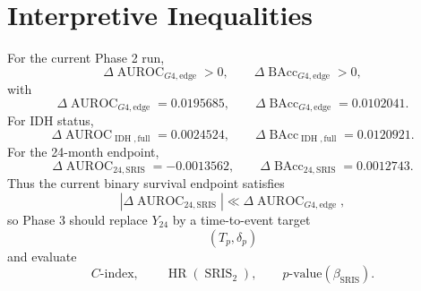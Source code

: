 \documentclass[11pt]{article}
\newcommand{\SRIS}{\operatorname{SRIS}}
\newcommand{\AUC}{\operatorname{AUROC}}
\newcommand{\BAcc}{\operatorname{BAcc}}
\begin{document}
\section{Interpretive Inequalities}

For the current Phase 2 run,
\[
\Delta\AUC_{G4,\text{edge}}>0,
\qquad
\Delta\BAcc_{G4,\text{edge}}>0,
\]
with
\[
\Delta\AUC_{G4,\text{edge}}=0.0195685,
\qquad
\Delta\BAcc_{G4,\text{edge}}=0.0102041.
\]
For IDH status,
\[
\Delta\AUC_{\operatorname{IDH},\text{full}}=0.0024524,
\qquad
\Delta\BAcc_{\operatorname{IDH},\text{full}}=0.0120921.
\]
For the 24-month endpoint,
\[
\Delta\AUC_{24,\text{SRIS}}=-0.0013562,
\qquad
\Delta\BAcc_{24,\text{SRIS}}=0.0012743.
\]
Thus the current binary survival endpoint satisfies
\[
|\Delta\AUC_{24,\text{SRIS}}|\ll \Delta\AUC_{G4,\text{edge}},
\]
so Phase 3 should replace $Y_{24}$ by a time-to-event target
\[
(T_p,\delta_p)
\]
and evaluate
\[
C\text{-index},\qquad
\operatorname{HR}(\SRIS_2),\qquad
p\text{-value}(\beta_{\SRIS}).
\]
\end{document}
